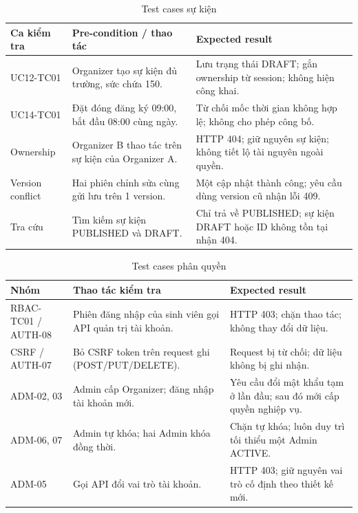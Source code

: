 \begin{table}[H]
\centering\small
\caption{Test cases sự kiện}\label{tab:i1-event-cases}
\begin{tabularx}{\linewidth}{@{}p{.17\linewidth}XX@{}}
\toprule
\textbf{Ca kiểm tra} & \textbf{Pre-condition / thao tác} & \textbf{Expected result}\\\midrule
UC12-TC01 & Organizer tạo sự kiện đủ trường, sức chứa 150. & Lưu trạng thái DRAFT; gắn ownership từ session; không hiện công khai.\\
UC14-TC01 & Đặt đóng đăng ký 09:00, bắt đầu 08:00 cùng ngày. & Từ chối mốc thời gian không hợp lệ; không cho phép công bố.\\
Ownership & Organizer B thao tác trên sự kiện của Organizer A. & HTTP 404; giữ nguyên sự kiện; không tiết lộ tài nguyên ngoài quyền.\\
Version conflict & Hai phiên chỉnh sửa cùng gửi lưu trên 1 version. & Một cập nhật thành công; yêu cầu dùng version cũ nhận lỗi 409.\\
Tra cứu & Tìm kiếm sự kiện PUBLISHED và DRAFT. & Chỉ trả về PUBLISHED; sự kiện DRAFT hoặc ID không tồn tại nhận 404.\\
\bottomrule\end{tabularx}
\end{table}

\begin{table}[H]
\centering\small
\caption{Test cases phân quyền}\label{tab:i1-rbac-cases}
\begin{tabularx}{\linewidth}{@{}p{.20\linewidth}XX@{}}
\toprule
\textbf{Nhóm} & \textbf{Thao tác kiểm tra} & \textbf{Expected result}\\\midrule
RBAC-TC01 / AUTH-08 & Phiên đăng nhập của sinh viên gọi API quản trị tài khoản. & HTTP 403; chặn thao tác; không thay đổi dữ liệu.\\
CSRF / AUTH-07 & Bỏ CSRF token trên request ghi (POST/PUT/DELETE). & Request bị từ chối; dữ liệu không bị ghi nhận.\\
ADM-02, 03 & Admin cấp Organizer; đăng nhập tài khoản mới. & Yêu cầu đổi mật khẩu tạm ở lần đầu; sau đó mới cấp quyền nghiệp vụ.\\
ADM-06, 07 & Admin tự khóa; hai Admin khóa đồng thời. & Chặn tự khóa; luôn duy trì tối thiểu một Admin ACTIVE.\\
ADM-05 & Gọi API đổi vai trò tài khoản. & HTTP 403; giữ nguyên vai trò cố định theo thiết kế mới.\\
\bottomrule\end{tabularx}
\end{table}


